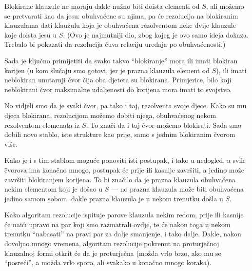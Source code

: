 Blokirane klauzule ne moraju dakle nužno biti doista elementi od $S$, ali možemo se pretvarati kao da jesu: obuhvaćene su njima, pa će rezolucija na blokiranim klauzulama dati klauzulu koja je obuhvaćena rezolventom neke dvije klauzule koje doista jesu u $S$. (Ovo je najmutniji dio, zbog kojeg je ovo samo ideja dokaza. Trebalo bi pokazati da rezolucija čuva relaciju uređaja po obuhvaćenosti.)


Sada je ključno primijetiti da svako takvo \enquote{blokiranje} mora ili imati blokiran korijen (u kom slučaju smo gotovi, jer je prazna klauzula element od $S$), ili imati neblokiran unutarnji čvor čija oba djeteta su blokirana. Primjerice, bilo koji neblokirani čvor maksimalne udaljenosti do korijena mora imati to svojstvo.

No vidjeli smo da je svaki čvor, pa tako i taj, rezolventa svoje djece. Kako su mu djeca blokirana, rezolucijom možemo dobiti njega, obuhvaćenog nekom rezolventom elemenata iz $S$. To znači da i taj čvor možemo blokirati. Sada smo dobili novo stablo, iste strukture kao prije, samo s jednim blokiranim čvorom više.

Kako je i s tim stablom moguće ponoviti isti postupak, i tako u nedogled, a svih čvorova ima konačno mnogo, postupak će prije ili kasnije završiti, a jedino može završiti blokiranjem korijena. To bi značilo da je prazna klauzula obuhvaćena nekim elementom koji je došao u $S$ --- no prazna klauzula može biti obuhvaćena jedino samom sobom, dakle prazna klauzula je u nekom trenutku došla u $S$.

Kako algoritam rezolucije ispituje parove klauzula nekim redom, prije ili kasnije će naići upravo na par koji smo razmatrali ovdje, te će nakon toga u nekom trenutku \enquote{nabasati} na pravi par za dalje smanjenje, i tako dalje. Dakle, nakon dovoljno mnogo vremena, algoritam rezolucije pokrenut na proturječnoj klauzalnoj formi otkrit će da je proturječna (možda vrlo brzo, ako mu se \enquote{posreći}, a možda vrlo sporo, ali svakako u konačno mnogo koraka).

